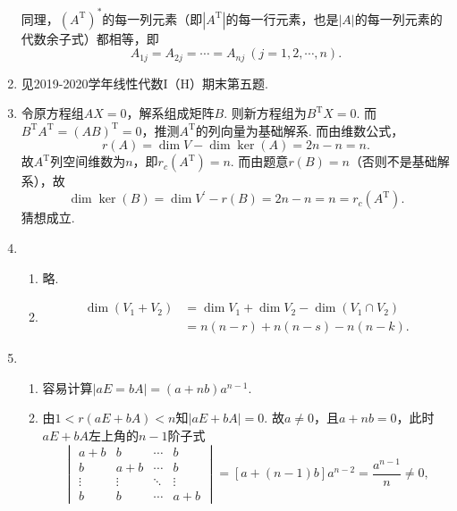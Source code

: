 \begin{enumerate}
        同理，$(A^\mathrm{T})^*$的每一列元素（即$|A^\mathrm{T}|$的每一行元素，也是$|A|$的每一列元素的代数余子式）都相等，即
        \begin{equation*}
            A_{1j}=A_{2j}=\cdots=A_{nj} \ (j=1,2,\cdots,n).
        \end{equation*}
    \item 见2019-2020学年线性代数I（H）期末第五题.
    \item 令原方程组$AX=0$，解系组成矩阵$B$. 则新方程组为$B^\mathrm{T}X=0$. 而$B^\mathrm{T}A^\mathrm{T}=(AB)^\mathrm{T}=0$，推测$A^\mathrm{T}$的列向量为基础解系. 而由维数公式，
    \begin{equation*}
        r(A)=\dim V-\dim\ker(A) = 2n-n=n.
    \end{equation*}
    故$A^\mathrm{T}$列空间维数为$n$，即$r_c(A^\mathrm{T})=n$. 而由题意$r(B)=n$（否则不是基础解系），故
    \begin{equation*}
        \dim{\ker(B)}=\dim{V^{\prime}}-r(B)=2n-n=n=r_c(A^\mathrm{T}).
    \end{equation*}
    猜想成立.
    \item
        \begin{enumerate}
            \item 略.
            \item
                \begin{align*}
                    \dim(V_1+V_2) &=\dim V_1+\dim V_2-\dim(V_1\cap V_2)\\
                                  &=n(n-r)+n(n-s)-n(n-k).
                \end{align*}
        \end{enumerate}
    \item
        \begin{enumerate}
            \item 容易计算$|aE=bA|=(a+nb)a^{n-1}$.
            \item
                由$1<r(aE+bA)<n$知$|aE+bA|=0$. 故$a\neq 0$，且$a+nb=0$，此时$aE+bA$左上角的$n-1$阶子式
                \begin{equation*}
                    \begin{vmatrix}
                        a+b & b & \cdots & b \\
                        b & a+b & \cdots & b \\
                        \vdots & \vdots & \ddots & \vdots \\
                        b & b & \cdots & a+b
                    \end{vmatrix}=[a+(n-1)b]a^{n-2}=\frac{a^{n-1}}{n}\neq 0,

\end{equation*}
\end{enumerate}
\end{enumerate}
